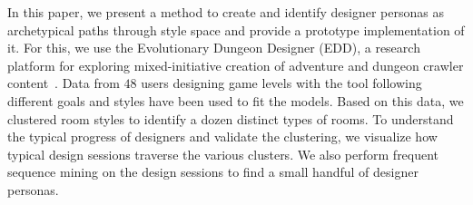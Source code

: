 In this paper, we present a method to create and identify designer personas as archetypical paths through style space and provide a prototype implementation of it. For this, we use the Evolutionary Dungeon Designer (EDD), a research platform for exploring mixed-initiative creation of adventure and dungeon crawler content~\cite{p10alvarez2019empowering,Baldwin2017}. Data from $48$ users designing game levels with the tool following different goals and styles have been used to fit the models. Based on this data, we clustered room styles to identify a dozen distinct types of rooms. To understand the typical progress of designers and validate the clustering, we visualize how typical design sessions traverse the various clusters. We also perform frequent sequence mining on the design sessions to find a small handful of designer personas.







